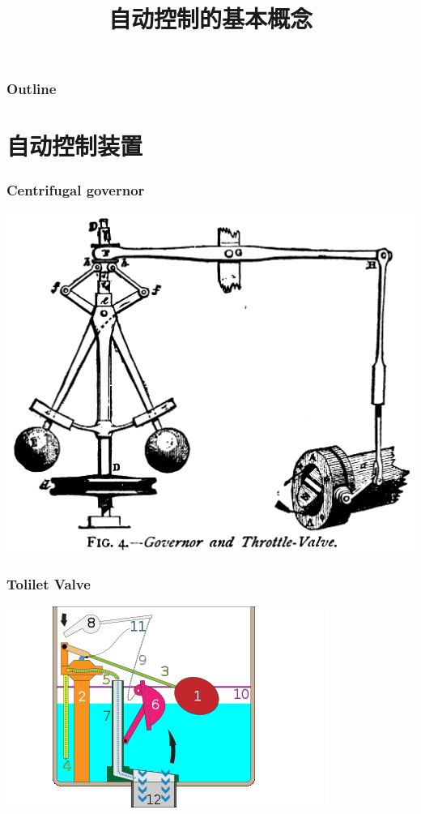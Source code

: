 \documentclass{beamer}
\title{自动控制的基本概念}
\author{}
\date{}
\begin{document}
\maketitle

\begin{frame}
\frametitle{Outline}
\setcounter{tocdepth}{3}
\tableofcontents
\end{frame}













\section{自动控制装置}
\label{sec-1}
\begin{frame}
\frametitle{Centrifugal governor}
\label{sec-1-1}

\includegraphics[width=\textwidth]{image/centrifugal_governor.png}
\end{frame}
\begin{frame}
\frametitle{Tolilet Valve}
\label{sec-1-2}

\includegraphics[width=\textwidth]{image/250px-Gravity_toilet_valves_handle_down.svg.png}
\end{frame}
\end{document}
